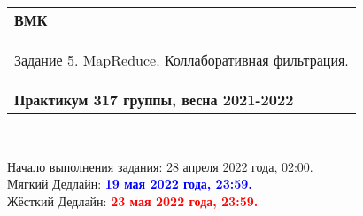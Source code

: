 \documentclass[10pt,fleqn]{article}
\begin{document}
\begin{center}
    \begin{tabular}{|p{17.5cm}|}
        \hline
        \textbf{ВМК}\\
        \begin{center} \Large Задание 5. MapReduce. Коллаборативная фильтрация. \end{center}\\
        \textbf{Практикум 317 группы, весна 2021-2022}\\
        \hline
    \end{tabular}
\end{center}

\

\begin{tabbing}
    Начало выполнения задания: 28 апреля 2022 года, 02:00.\\
    Мягкий Дедлайн: \textcolor{blue}{\bf 19 мая 2022 года, 23:59.}\\
    Жёсткий Дедлайн: \textcolor{red}{\bf 23 мая 2022 года, 23:59.}
\end{tabbing}

\end{document}
